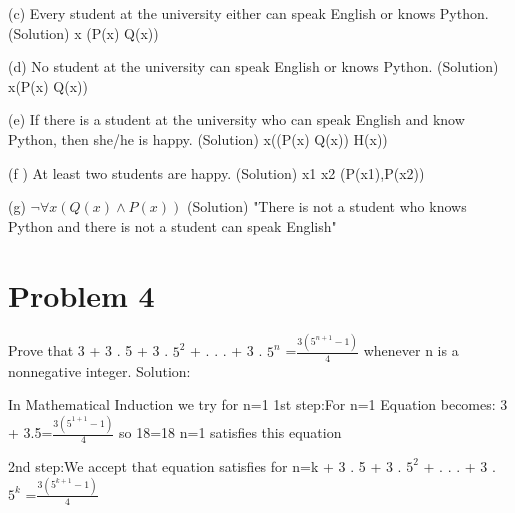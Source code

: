 \documentclass{article}
\begin{document}
    (c) Every student at the university either can speak English or knows Python.\newline
    (Solution)
    \forall x (P(x) \vee Q(x)) \newline
    
    (d) No student at the university can speak English or knows Python.\newline
    (Solution)
    \exists x(P(x) \vee Q(x)) \newline
    
    (e) If there is a student at the university who can speak English and know Python, then she/he is happy.\newline
    (Solution)
    \exists x((P(x) \wedge Q(x)) \Rightarrow H(x)) \newline
    
    (f ) At least two students are happy. \newline
    (Solution)
    \exists  x1  \exists  x2 (P(x1),P(x2)) \newline
    
    (g) $\neg \forall x (Q(x) \wedge P(x))$ \newline
    (Solution) "There is not a student who knows Python and there is not a student can speak English"
    
    
    \section{Problem 4}
    
    Prove that 3 + 3 . 5 + 3 . $5^2$ + . . . + 3 . $5^n$ =$\frac{3(5^{n+1} - 1)}{4}$ whenever n is a nonnegative integer.\newline
    Solution:
    
    In Mathematical Induction we try for n=1 \newline
    1st step:For n=1 Equation becomes:
   3 + 3.5=$\frac{3(5^{1+1} - 1)}{4}$ so 18=18 n=1 satisfies this equation\newline
   
   2nd step:We accept that equation satisfies for n=k  + 3 . 5 + 3 . $5^2$ + . . . + 3 . $5^k$ =$\frac{3(5^{k+1} - 1)}{4}$\newline
   
\end{document}
